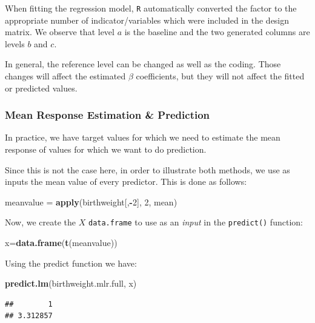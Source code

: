 \documentclass[
]{book}
\newenvironment{Shaded}{\begin{snugshade}}{\end{snugshade}}
\newcommand{\DecValTok}[1]{\textcolor[rgb]{0.00,0.00,0.81}{#1}}
\newcommand{\FunctionTok}[1]{\textcolor[rgb]{0.13,0.29,0.53}{\textbf{#1}}}
\newcommand{\NormalTok}[1]{#1}
\newcommand{\OtherTok}[1]{\textcolor[rgb]{0.56,0.35,0.01}{#1}}
\newcommand{\SpecialCharTok}[1]{\textcolor[rgb]{0.81,0.36,0.00}{\textbf{#1}}}
\begin{document}
When fitting the regression model, \texttt{R} automatically converted the factor to the appropriate number of indicator/variables which were included in the design matrix. We observe that level \(a\) is the baseline and the two generated columns are levels \(b\) and \(c\).

In general, the reference level can be changed as well as the coding. Those changes will affect the estimated \(\beta\) coefficients, but they will not affect the fitted or predicted values.

\subsubsection{Mean Response Estimation \& Prediction}\label{mean-response-estimation-prediction}

In practice, we have target values for which we need to estimate the mean response of values for which we want to do prediction.

Since this is not the case here, in order to illustrate both methods, we use as inputs the mean value of every predictor. This is done as follows:

\begin{Shaded}
\begin{Highlighting}[]
\NormalTok{meanvalue }\OtherTok{=} \FunctionTok{apply}\NormalTok{(birthweight[,}\SpecialCharTok{{-}}\DecValTok{2}\NormalTok{], }\DecValTok{2}\NormalTok{, mean)}
\end{Highlighting}
\end{Shaded}

Now, we create the \(X\) \texttt{data.frame} to use as an \emph{input} in the \texttt{predict()} function:

\begin{Shaded}
\begin{Highlighting}[]
\NormalTok{x}\OtherTok{=}\FunctionTok{data.frame}\NormalTok{(}\FunctionTok{t}\NormalTok{(meanvalue))}
\end{Highlighting}
\end{Shaded}

Using the predict function we have:

\begin{Shaded}
\begin{Highlighting}[]
\FunctionTok{predict.lm}\NormalTok{(birthweight.mlr.full, x)}
\end{Highlighting}
\end{Shaded}

\begin{verbatim}
##        1 
## 3.312857
\end{verbatim}
\end{document}
